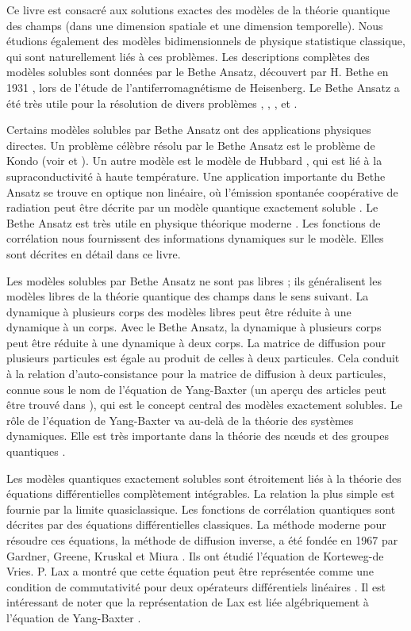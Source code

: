 Ce livre est consacré aux solutions exactes des modèles de la théorie quantique des champs (dans une dimension spatiale et une dimension temporelle). Nous étudions également des modèles bidimensionnels de physique statistique classique, qui sont naturellement liés à ces problèmes. Les descriptions complètes des modèles solubles sont données par le Bethe Ansatz, découvert par H. Bethe en 1931 \cite{??}, lors de l'étude de l'antiferromagnétisme de Heisenberg. Le Bethe Ansatz a été très utile pour la résolution de divers problèmes \cite{??, ??, ??, ??}, \cite{??}, \cite{??}, et \cite{??}.

Certains modèles solubles par Bethe Ansatz ont des applications physiques directes. Un problème célèbre résolu par le Bethe Ansatz est le problème de Kondo (voir \cite{??} et \cite{??}). Un autre modèle est le modèle de Hubbard \cite{??}, qui est lié à la supraconductivité à haute température. Une application importante du Bethe Ansatz se trouve en optique non linéaire, où l'émission spontanée coopérative de radiation peut être décrite par un modèle quantique exactement soluble \cite{??}. Le Bethe Ansatz est très utile en physique théorique moderne \cite{??, ??}. Les fonctions de corrélation nous fournissent des informations dynamiques sur le modèle. Elles sont décrites en détail dans ce livre.

Les modèles solubles par Bethe Ansatz ne sont pas libres ; ils généralisent les modèles libres de la théorie quantique des champs dans le sens suivant. La dynamique à plusieurs corps des modèles libres peut être réduite à une dynamique à un corps. Avec le Bethe Ansatz, la dynamique à plusieurs corps peut être réduite à une dynamique à deux corps. La matrice de diffusion pour plusieurs particules est égale au produit de celles à deux particules. Cela conduit à la relation d'auto-consistance pour la matrice de diffusion à deux particules, connue sous le nom de l'équation de Yang-Baxter (un aperçu des articles peut être trouvé dans \cite{??}), qui est le concept central des modèles exactement solubles. Le rôle de l'équation de Yang-Baxter va au-delà de la théorie des systèmes dynamiques. Elle est très importante dans la théorie des nœuds \cite{??} et des groupes quantiques \cite{??}.

Les modèles quantiques exactement solubles sont étroitement liés à la théorie des équations différentielles complètement intégrables. La relation la plus simple est fournie par la limite quasiclassique. Les fonctions de corrélation quantiques sont décrites par des équations différentielles classiques. La méthode moderne pour résoudre ces équations, la méthode de diffusion inverse, a été fondée en 1967 par Gardner, Greene, Kruskal et Miura \cite{??}. Ils ont étudié l'équation de Korteweg-de Vries. P. Lax a montré que cette équation peut être représentée comme une condition de commutativité pour deux opérateurs différentiels linéaires \cite{??}. Il est intéressant de noter que la représentation de Lax est liée algébriquement à l'équation de Yang-Baxter \cite{??}.

